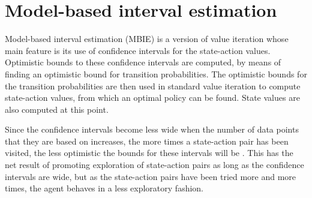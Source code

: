 \section{Model-based interval estimation}
\label{sec:mbie}

Model-based interval estimation (MBIE) is a version of value iteration whose main
feature is its use of confidence intervals for the state-action values.
Optimistic bounds to these confidence intervals are computed, by means of
finding an optimistic bound for transition probabilities. The optimistic bounds
for the transition probabilities are then used in standard value iteration to
compute state-action values, from which an optimal policy can be found. State
values are also computed at this point.

Since the confidence intervals become less wide when the number of data
points that they are based on increases, the more times a state-action pair
has been visited, the less optimistic the bounds for these intervals will be
\parencite{dietterich2013pac}. This has the net result of promoting
exploration of state-action pairs as long as the confidence intervals are
wide, but as the state-action pairs have been tried more and more times, the
agent behaves in a less exploratory fashion. 


\begin{comment}
Model-based interval estimation is a modification of value iteration whose main feature is its  addition of confidence
intervals to the state-action values. These confidence intervals allow the agent to choose between
actions, based on how confident it is about its evaluation of them. In effect,
the less certain the agent is about its evaluation of the states and actions,
the more exploratory the actions will be. When the agent is more confident
however, it will exploit what it has learned so far about the MDP
\parencite{dietterich2013pac}.
\end{comment}






